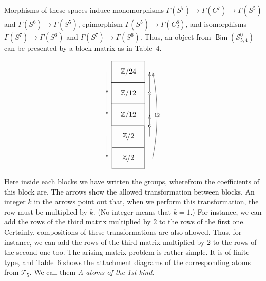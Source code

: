 \documentclass[12pt,a4paper]{amsart}
\theoremstyle{definition}
\theoremstyle{remark}
\numberwithin{equation}{section}
\begin{document}
\smallskip
 \noindent
 Morphisms of these spaces induce monomorphisms
 ${\Gamma}(S^7)\to{\Gamma}(C^7)\to{\Gamma}(S^5)$ and ${\Gamma}(S^6)\to{\Gamma}(S^5)$,
 epimorphism  ${\Gamma}(S^5)\to{\Gamma}(C_2^8)$, and isomorphisms
 ${\Gamma}(S^7)\to{\Gamma}(S^6)$ and ${\Gamma}(S^7)\to{\Gamma}(S^6)$. Thus, an object from
 ${\mathop\mathsf{Bim}\nolimits}({\mathscr S}^0_{5,4})$ can be presented by a block matrix as in
 Table~4.
\begin{table}[htp]
 \caption{}\vspace*{-1.5em}
   \[
  \xymatrix@R=0em@C=1.5ex {*=0{} \ar[d] & *+<2.5em,2em>[F]{{\mathbb Z}/24}& *=0{} \\
              *=0{}\ar[d]&  *+<2.5em,2em>[F]{{\mathbb Z}/12} & *=0{} \\
                *=0{}       &  *+<2.5em,2em>[F]{{\mathbb Z}/12} & *=0{}\ar[uu]|2 \\
                *=0{}\ar[d]& *+<2.5em,2em>[F]{\,{\mathbb Z}/2\,} & *=0{}\ar[u]|6  \\
               *=0{}       &   *+<2.5em,2em>[F]{\,{\mathbb Z}/2\,} & *=0{} \ar@/_/@<-1ex>[uuuu]|{12}
	     }
 \]
\end{table}
 Here inside each blocks we have written the groups,
 wherefrom the coefficients of this block are. The arrows show the
 allowed transformation between blocks. An integer $k$ in the arrows
 point out that, when we perform this transformation, the row must be
 multiplied by $k$. (No integer means that $k=1$.) For instance, we
 can add the rows of the third matrix multiplied by $2$ to the rows of
 the first one. Certainly, compositions of these transformations are
 also allowed. Thus, for instance,  we can add the rows of the third
 matrix multiplied by $2$ to the rows of the second one too. The
 arising matrix problem is rather simple. It is of finite type, and
 Table~6 shows the attachment diagrams of the corresponding atoms
 from ${\mathscr T}_5$. We call them \emph{A-atoms of the 1st kind}.
\end{document}
